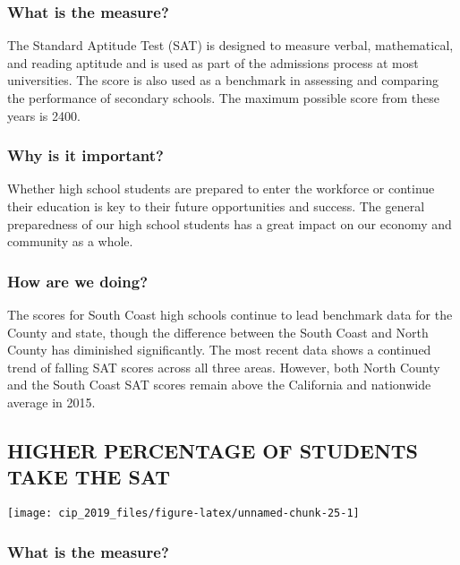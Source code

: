 \documentclass[]{book}
\theoremstyle{definition}
\theoremstyle{definition}
\theoremstyle{definition}
\theoremstyle{remark}
\begin{document}
\subsubsection*{What is the measure?}\label{what-is-the-measure-14}

The Standard Aptitude Test (SAT) is designed to measure verbal,
mathematical, and reading aptitude and is used as part of the admissions
process at most universities. The score is also used as a benchmark in
assessing and comparing the performance of secondary schools. The
maximum possible score from these years is 2400.

\subsubsection*{Why is it important?}\label{why-is-it-important-12}

Whether high school students are prepared to enter the workforce or
continue their education is key to their future opportunities and
success. The general preparedness of our high school students has a
great impact on our economy and community as a whole.

\subsubsection*{How are we doing?}\label{how-are-we-doing-16}

The scores for South Coast high schools continue to lead benchmark data
for the County and state, though the difference between the South Coast
and North County has diminished significantly. The most recent data
shows a continued trend of falling SAT scores across all three areas.
However, both North County and the South Coast SAT scores remain above
the California and nationwide average in 2015.

\subsection*{HIGHER PERCENTAGE OF STUDENTS TAKE THE
SAT}\label{higher-percentage-of-students-take-the-sat}

\texttt{[image: cip\_2019\_files/figure-latex/unnamed-chunk-25-1]}

\subsubsection*{What is the measure?}\label{what-is-the-measure-15}
\end{document}
